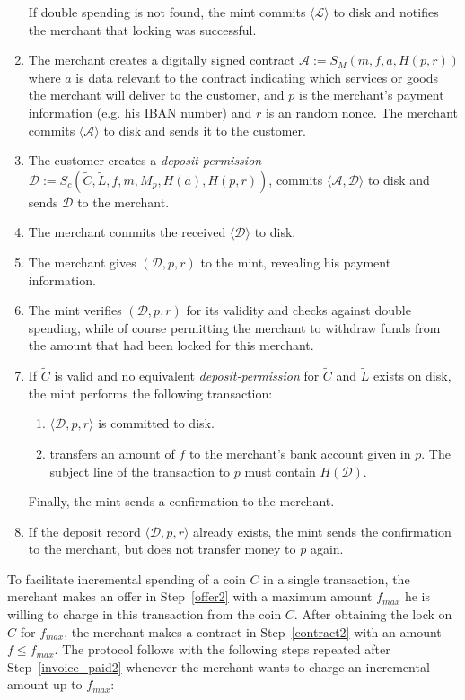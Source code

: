 \documentclass{llncs}
\begin{document}
\begin{enumerate}
  If double spending is not found,
  the mint commits $\langle \mathcal{L} \rangle$ to disk
  and notifies the merchant that locking was successful.
\item\label{contract2} The merchant creates a digitally signed contract
  $\mathcal{A} := S_M(m, f, a, H(p, r))$ where $a$ is data relevant to the contract
  indicating which services or goods the merchant will deliver to the customer, and $p$ is the
  merchant's payment information (e.g. his IBAN number) and $r$ is an random nonce.
  The merchant commits $\langle \mathcal{A} \rangle$ to disk and sends it to the customer.
\item The customer creates a
  \emph{deposit-permission} $\mathcal{D} := S_c(\widetilde{C}, \widetilde{L}, f, m, M_p, H(a), H(p, r))$, commits
  $\langle \mathcal{A}, \mathcal{D} \rangle$ to disk and sends $\mathcal{D}$ to the merchant.
\item\label{invoice_paid2} The merchant commits the received $\langle \mathcal{D} \rangle$ to disk.
\item The merchant gives $(\mathcal{D}, p, r)$ to the mint, revealing his
  payment information.
\item The mint verifies $(\mathcal{D}, p, r)$ for its validity and
  checks against double spending, while of
  course permitting the merchant to withdraw funds from the amount that
  had been locked for this merchant.
 \item If $\widetilde{C}$ is valid and no equivalent \emph{deposit-permission} for $\widetilde{C}$ and $\widetilde{L}$ exists on disk, the
  mint performs the following transaction:
  \begin{enumerate}
    \item $\langle \mathcal{D}, p, r \rangle$ is committed to disk.
    \item\label{transfer2} transfers an amount of $f$ to the merchant's bank account
      given in $p$.  The subject line of the transaction to $p$ must contain
      $H(\mathcal{D})$.
  \end{enumerate}
  Finally, the mint sends a confirmation to the merchant.
 \item If the deposit record $\langle \mathcal{D}, p, r \rangle$ already exists,
  the mint sends the confirmation to the merchant,
  but does not transfer money to $p$ again.
\end{enumerate}

To facilitate incremental spending of a coin $C$ in a single transaction, the
merchant makes an offer in Step~\ref{offer2} with a maximum amount $f_{max}$ he
is willing to charge in this transaction from the coin $C$.  After obtaining the
lock on $C$ for $f_{max}$, the merchant makes a contract in Step~\ref{contract2}
with an amount $f \leq f_{max}$.  The protocol follows with the following steps
repeated after Step~\ref{invoice_paid2} whenever the merchant wants to charge an
incremental amount up to $f_{max}$:
\end{document}
